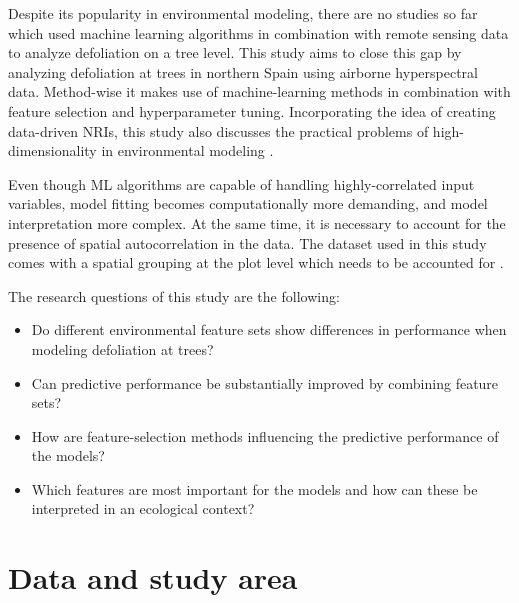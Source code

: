 \documentclass[letterpaper, peerreview]{IEEEtran}
\begin{document}

Despite its popularity in environmental modeling, there are no studies so far which used machine learning algorithms in combination with remote sensing data to analyze defoliation on a tree level.
This study aims to close this gap by analyzing defoliation at trees in northern Spain using airborne hyperspectral data.
Method-wise it makes use of machine-learning methods in combination with feature selection and hyperparameter tuning.
Incorporating the idea of creating data-driven \ac{NRI}s, this study also discusses the practical problems of high-dimensionality in environmental modeling \cite{trunk1979, xu2016}.

Even though \ac{ML} algorithms are capable of handling highly-correlated input variables, model fitting becomes computationally more demanding, and model interpretation more complex.
At the same time, it is necessary to account for the presence of spatial autocorrelation in the data.
The dataset used in this study comes with a spatial grouping at the plot level which needs to be accounted for \cite{sperrorest, pena2015}.

The research questions of this study are the following:

\begin{itemize}

	\item Do different environmental feature sets show differences in performance when modeling defoliation at trees?
	      
	\item Can predictive performance be substantially improved by combining feature sets?
	      
	\item How are feature-selection methods influencing the predictive performance of the models?
	      
	\item Which features are most important for the models and how can these be interpreted in an ecological context?
	      
\end{itemize}

\section{Data and study area}
\end{document}

